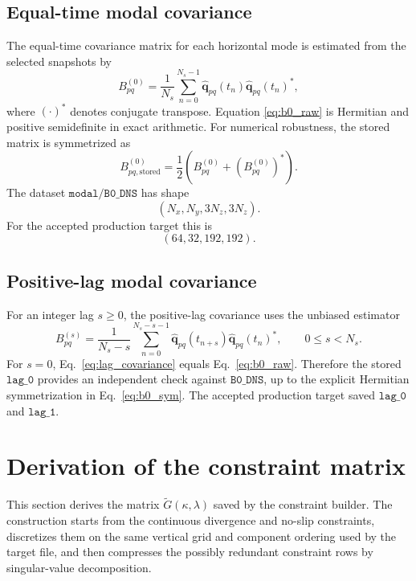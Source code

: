 \documentclass[11pt]{article}
\newcommand{\bfq}{\bm{q}}
\newcommand{\Gtilde}{\widetilde{G}}
\begin{document}
\subsection{Equal-time modal covariance}

The equal-time covariance matrix for each horizontal mode is estimated from
the selected snapshots by
\begin{equation}
  B^{(0)}_{pq}
  =
  \frac{1}{N_s}
  \sum_{n=0}^{N_s-1}
  \widehat{\bfq}_{pq}(t_n)
  \widehat{\bfq}_{pq}(t_n)^*,
  \label{eq:b0_raw}
\end{equation}
where \((\cdot)^*\) denotes conjugate transpose. Equation
\eqref{eq:b0_raw} is Hermitian and positive semidefinite in exact arithmetic.
For numerical robustness, the stored matrix is symmetrized as
\begin{equation}
  B^{(0)}_{pq,\mathrm{stored}}
  =
  \frac{1}{2}\left(B^{(0)}_{pq}+\left(B^{(0)}_{pq}\right)^*\right).
  \label{eq:b0_sym}
\end{equation}
The dataset \(\texttt{modal/B0\_DNS}\) has shape
\[
  (N_x,N_y,3N_z,3N_z).
\]
For the accepted production target this is
\[
  (64,32,192,192).
\]

\subsection{Positive-lag modal covariance}

For an integer lag \(s\ge 0\), the positive-lag covariance uses the unbiased
estimator
\begin{equation}
  B^{(s)}_{pq}
  =
  \frac{1}{N_s-s}
  \sum_{n=0}^{N_s-s-1}
  \widehat{\bfq}_{pq}(t_{n+s})
  \widehat{\bfq}_{pq}(t_n)^*,
  \qquad 0\le s<N_s.
  \label{eq:lag_covariance}
\end{equation}
For \(s=0\), Eq.~\eqref{eq:lag_covariance} equals
Eq.~\eqref{eq:b0_raw}. Therefore the stored \(\texttt{lag\_0}\) provides an
independent check against \(\texttt{B0\_DNS}\), up to the explicit Hermitian
symmetrization in Eq.~\eqref{eq:b0_sym}. The accepted production target saved
\(\texttt{lag\_0}\) and \(\texttt{lag\_1}\).

\section{Derivation of the constraint matrix}
\label{sec:constraint}

This section derives the matrix \(\Gtilde(\kappa,\lambda)\) saved by the
constraint builder. The construction starts from the continuous divergence and
no-slip constraints, discretizes them on the same vertical grid and component
ordering used by the target file, and then compresses the possibly redundant
constraint rows by singular-value decomposition.
\end{document}
